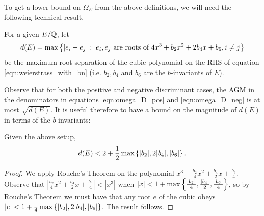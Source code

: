 To get a lower bound on $\Omega_E$ from the above definitions, we will need the following technical result.
\begin{definition}
For a given $E/\mathbb{Q}$, let 
\begin{equation}
d(E) = \max\left\{|e_i - e_j|: \; e_i,e_j \text{ are roots of }4x^3 + b_2  x^2 + 2 b_4 x + b_6, i\ne j\right\}
\end{equation}
be the maximum root separation of the cubic polynomial on the RHS of equation \ref{eqn:weierstrass_with_bn}
(i.e. $b_2, b_4$ and $b_6$ are the $b$-invariants of $E$).
\end{definition}
Observe that for both the positive and negative discriminant cases, the AGM in the denominators in equations \ref{eqn:omega_D_pos} and \ref{eqn:omega_D_neg} is at most $\sqrt{d(E)}$. It is useful therefore to have a bound on the magnitude of $d(E)$ in terms of the $b$-invariants:
\begin{lemma}\label{lem:root_separation_bound}
Given the above setup,
\begin{equation}
d(E) < 2+\frac{1}{2}\max\left\{|b_2|,2|b_4|,|b_6|\right\}.
\end{equation}
\end{lemma}
\begin{proof}
We apply Rouche's Theorem on the polynomial $x^3 + \frac{b_2}{4} x^2 + \frac{b_4}{2} x + \frac{b_6}{4}$. Observe that $|\frac{b_2}{4} x^2 + \frac{b_4}{2} x + \frac{b_6}{4}| < |x^3|$ when $|x| < 1+\max\left\{\frac{|b_2|}{4},\frac{|b_4|}{2},\frac{|b_6|}{4}\right\}$, so by Rouche's Theorem we must have that any root $e$ of the cubic obeys $|e| <  1+\frac{1}{4}\max\left\{|b_2|,2|b_4|,|b_6|\right\}$. The result follows.
\end{proof}

